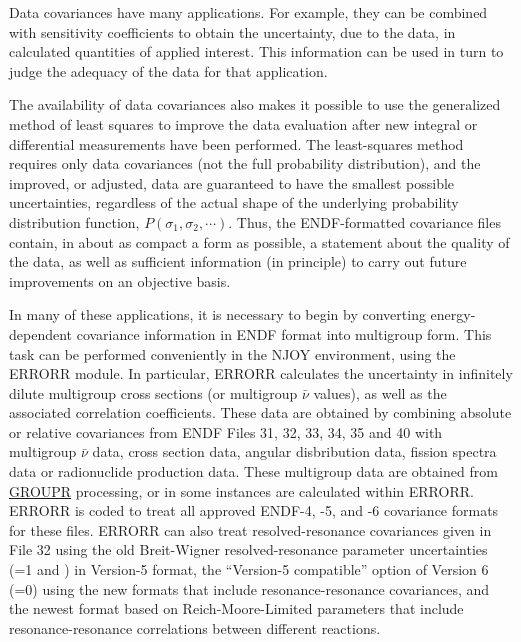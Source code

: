 Data covariances have many applications.  For example, they can be
combined with sensitivity coefficients to obtain the uncertainty, due
to the data, in calculated quantities of applied interest\cite{Gerstl}.
This information can be used in turn to judge the adequacy of the data
for that application.

The availability of data covariances also makes it possible to use the
generalized method of least squares to improve the data evaluation
after new integral or differential measurements have been
performed\cite{Reupke}.  The least-squares method requires only data
covariances (not the full probability distribution), and the improved,
or adjusted, data are guaranteed\cite{Hamilton} to have the smallest
possible uncertainties, regardless of the actual shape of the underlying
probability distribution function, $P(\sigma_1, \sigma_2,\cdots)$.
Thus, the ENDF-formatted covariance files contain, in about as compact
a form as possible, a statement about the quality of the data, as well
as sufficient information (in principle) to carry out future
improvements on an objective basis.

In many of these applications, it is necessary to begin by converting
energy-dependent covariance information in ENDF format\cite{ENDF102}
into multigroup form.  This task can be performed conveniently in the
NJOY environment, using the ERRORR module.  In particular,
ERRORR calculates the uncertainty in infinitely dilute multigroup cross
sections (or multigroup $\bar{\nu}$ values), as well as the associated
correlation coefficients.  These data are obtained by combining
absolute or relative covariances from ENDF Files 31, 32, 33, 34, 35 and 40
with multigroup $\bar{\nu}$ data, cross section data, angular disbribution
data, fission spectra data or radionuclide production data.  These
multigroup data are obtained from \hyperlink{sGROUPRhy}{GROUPR}
processing, or in some instances are calculated
within ERRORR.  ERRORR is coded to treat all approved ENDF-4, -5, and -6
covariance formats for these files.  ERRORR can also treat
resolved-resonance covariances given in File 32 using the old
Breit-Wigner resolved-resonance parameter uncertainties (=1
and ) in Version-5 format, the ``Version-5 compatible''
option of Version 6 (=0) using the new formats
that include resonance-resonance covariances, and the newest
format based on Reich-Moore-Limited parameters that include
resonance-resonance correlations between different reactions.


